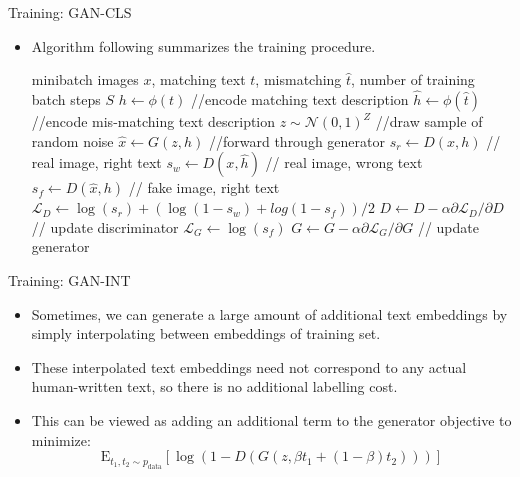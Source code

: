 \documentclass[10pt]{beamer}
\begin{document}
	\begin{frame}{Training: GAN-CLS}
		\begin{itemize}
			\item Algorithm following summarizes the training procedure.
			\begin{algorithm}[H]
				\footnotesize
				\caption{\footnotesize GAN-CLS training algorithm with step size $\alpha$, using minibatch SGD for simplicity.}
				\begin{algorithmic}
					\REQUIRE minibatch images $x$, matching text $t$, mismatching $\hat{t}$, number of training batch steps $S$
						\STATE $h\leftarrow\phi(t)$ //encode matching text description
						\STATE $\hat{h}\leftarrow\phi(\hat{t})$ //encode mis-matching text description
						\STATE $z\sim\mathcal{N}(0,1)^Z$ //draw sample of random noise
						\STATE $\hat{x}\leftarrow G(z,h)$ //forward through generator
						\STATE $s_r\leftarrow D(x,h)$ // real image, right text
						\STATE $s_w\leftarrow D(x,\hat{h})$ // real image, wrong text
						\STATE $s_f\leftarrow D(\hat{x},h)$ // fake image, right text
						\STATE $\mathcal{L}_D\leftarrow\log(s_r)+(\log(1-s_w)+log(1-s_f))/2$  
						\STATE $D\leftarrow D-\alpha\partial\mathcal{L}_D/\partial D$ // update discriminator
						\STATE $\mathcal{L}_G\leftarrow\log(s_f)$
						\STATE $G\leftarrow G-\alpha\partial\mathcal{L}_G/\partial G$ // update generator
					\ENDFOR
				\end{algorithmic}
			\end{algorithm}
		\end{itemize}
	\end{frame}

	\begin{frame}{Training: GAN-INT}
		\begin{itemize}
			\item Sometimes, we can generate a large amount of additional text embeddings by simply interpolating between embeddings of training set.
			\item These interpolated text embeddings need not correspond to any actual human-written text, so there is no additional labelling cost.
			\item This can be viewed as adding an additional term to the generator objective to minimize:
			$$
			\mathrm{E}_{t_1,t_2\sim p_{\text{data}}}\left[\log(1-D(G(z,\beta t_1+(1-\beta)t_2)))\right]
			$$
		\end{itemize}
	\end{frame}
\end{document}
